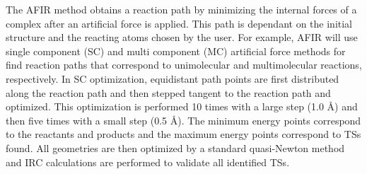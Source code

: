\documentclass[preprint, 11pt]{elsarticle} %
\begin{document}

The AFIR method obtains a reaction path by minimizing the internal forces of a complex after an artificial force is applied.
This path is dependant on the initial structure and the reacting atoms chosen by the user. 
For example, AFIR will use single component (SC) and multi component (MC) artificial force methods for find reaction paths that correspond to unimolecular and multimolecular reactions, respectively.
In SC optimization, equidistant path points are first distributed along the reaction path and then stepped tangent to the reaction path and optimized.
This optimization is performed 10 times with a large step (1.0 \AA) and then five times with a small step (0.5 \AA). 
The minimum energy points correspond to the reactants and products and the maximum energy points correspond to TSs found. 
All geometries are then optimized by a standard quasi-Newton method and IRC calculations are performed to validate all identified TSs.
\end{document}
